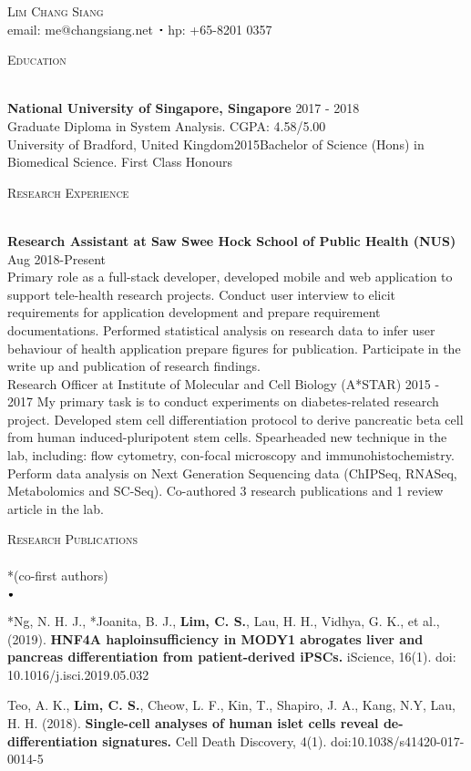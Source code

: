 \documentclass[11pt]{article}
\newcommand{\lineunder}{\vspace*{-8pt} \\ \hspace*{-18pt} \hrulefill \\}
\newcommand{\header}[1]{{\hspace*{-15pt}\vspace*{6pt} \textsc{#1}} \vspace*{-6pt} \lineunder}
\newcommand{\contact}[2]{
\begin{center}
{\LARGE \scshape {#1}}\\
#2
\end{center}
\vspace*{-8pt}
}
\newcommand{\sbt}{\,\begin{picture}(-1,1)(-1,-3)\circle*{2}\end{picture}\ }
\newcommand{\lbt}{\,\begin{picture}(-1,1)(-1,-3)\circle*{3}\end{picture}\ }
\newenvironment{achievements}{
    \begin{list}{$\lbt$}{
        \topsep 0pt
        \itemsep 0pt
        \addtolength{\leftmargin}{-0.1in}
    }
}
{
    \vspace*{4pt}
    \end{list}
}
\newcommand{\schoolwithcourses}[4]{
 \textbf{#1} \hfill{#2}\\
    #3\\
\vspace*{5pt}
}
\begin{document}

\small
\smallskip
\vspace*{-35pt}

\contact{Lim Chang Siang}
{email: me@changsiang.net $\sbt$ hp: +65-8201 0357}

\header{Education}
\vspace{2mm}
\schoolwithcourses{National University of Singapore, Singapore}{2017 - 2018}{Graduate Diploma in System Analysis. CGPA: 4.58/5.00}

\schoolwithcourses{University of Bradford, United Kingdom}{2015}{Bachelor of Science (Hons) in Biomedical Science. First Class Honours}
\hfill{}


\header{Research Experience}
\vspace{2mm}
\schoolwithcourses{Research Assistant at Saw Swee Hock School of Public Health (NUS)}{ Aug 2018-Present}
{Primary role as a full-stack developer, developed mobile and web application to support tele-health research projects. Conduct user interview to elicit requirements for application development and prepare requirement documentations. Performed statistical analysis on research data to infer user behaviour of health application prepare figures for publication. Participate in the write up and publication of research findings.}

\schoolwithcourses{Research Officer at Institute of Molecular and Cell Biology (A*STAR)}{
2015 - 2017}
{My primary task is to conduct experiments on diabetes-related research project. Developed stem cell differentiation protocol to derive pancreatic beta cell from human induced-pluripotent stem cells. Spearheaded new technique in the lab, including: flow cytometry, con-focal microscopy and immunohistochemistry. Perform data analysis on Next Generation Sequencing data (ChIPSeq, RNASeq, Metabolomics and SC-Seq). Co-authored 3 research publications and 1 review article in the lab.}
\hfill{}

\header{Research Publications} {*(co-first authors)}
\vspace{2mm}
\begin{achievements}
\justifying
\item {*Ng, N. H. J., *Joanita, B. J., \textbf{Lim, C. S.}, Lau, H. H., Vidhya, G. K., et al., (2019). \textbf{HNF4A haploinsufficiency in MODY1 abrogates liver and pancreas differentiation from patient-derived iPSCs.} iScience, 16(1). doi: 10.1016/j.isci.2019.05.032}
\item {Teo, A. K., \textbf{Lim, C. S.}, Cheow, L. F., Kin, T., Shapiro, J. A., Kang, N.Y, Lau, H. H. (2018). \textbf{Single-cell analyses of human islet cells reveal de-differentiation signatures.} Cell Death Discovery, 4(1). doi:10.1038/s41420-017-0014-5}
\end{achievements}
\hfill{}
\end{document}
